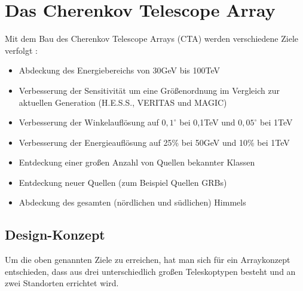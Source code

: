 \chapter{Das Cherenkov Telescope Array}
Mit dem Bau des Cherenkov Telescope Arrays (CTA) werden verschiedene Ziele verfolgt \cite{NextGen}:
\begin{itemize}

\item Abdeckung des Energiebereichs von 30GeV bis 100TeV
\item Verbesserung der Sensitivität um eine Größenordnung im Vergleich zur aktuellen Generation (H.E.S.S., VERITAS und MAGIC)
\item Verbesserung der Winkelauflösung auf $0,1^{\circ}$ bei 0,1TeV und $0,05^{\circ}$ bei 1TeV
\item Verbesserung der Energieauflösung auf 25\% bei 50GeV und 10\% bei 1TeV
\item Entdeckung einer großen Anzahl von Quellen bekannter Klassen
\item Entdeckung neuer Quellen (zum Beispiel Quellen GRBs)
\item Abdeckung des gesamten (nördlichen und südlichen) Himmels
\end{itemize}

\section{Design-Konzept}
Um die oben genannten Ziele zu erreichen, hat man sich für ein Arraykonzept entschieden, dass aus drei unterschiedlich großen Teleskoptypen besteht und an zwei Standorten errichtet wird.

